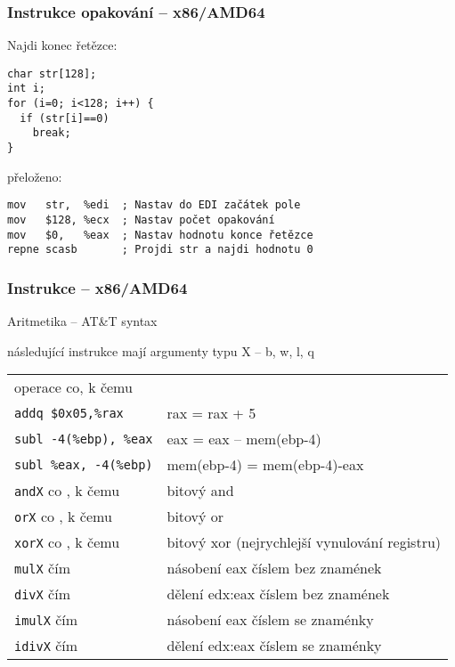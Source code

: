 \documentclass{beamer}
\begin{document}
\begin{frame}[fragile]
\frametitle{Instrukce opakování – x86/AMD64}

Najdi konec řetězce:
\begin{verbatim}
char str[128];
int i;
for (i=0; i<128; i++) {
  if (str[i]==0) 
    break;
}
\end{verbatim}
přeloženo:
\begin{verbatim}
mov   str,  %edi  ; Nastav do EDI začátek pole
mov   $128, %ecx  ; Nastav počet opakování
mov   $0,   %eax  ; Nastav hodnotu konce řetězce
repne scasb       ; Projdi str a najdi hodnotu 0
\end{verbatim}

\end{frame}



\begin{frame}
\frametitle{Instrukce – x86/AMD64}
Aritmetika -- AT\&T syntax

následující instrukce mají argumenty typu X -- b, w, l, q
\begin{tabular}{ l l}
operace co, k čemu &\\
\texttt{addq    \$0x05,\%rax} & rax = rax + 5\\
\texttt{subl    -4(\%ebp), \%eax} &  eax = eax -- mem(ebp-4)\\
\texttt{subl    \%eax, -4(\%ebp)} & mem(ebp-4) = mem(ebp-4)-eax\\
\texttt{andX} co , k čemu& bitový and\\
\texttt{orX} co , k čemu& bitový or\\
\texttt{xorX} co , k čemu& bitový xor (nejrychlejší vynulování registru)\\
\texttt{mulX} čím & násobení eax číslem bez znamének\\
\texttt{divX} čím & dělení edx:eax číslem bez znamének\\
\texttt{imulX} čím & násobení eax číslem se znaménky\\
\texttt{idivX} čím & dělení edx:eax číslem se znaménky\\
\end{tabular}
\end{frame}
\end{document}
